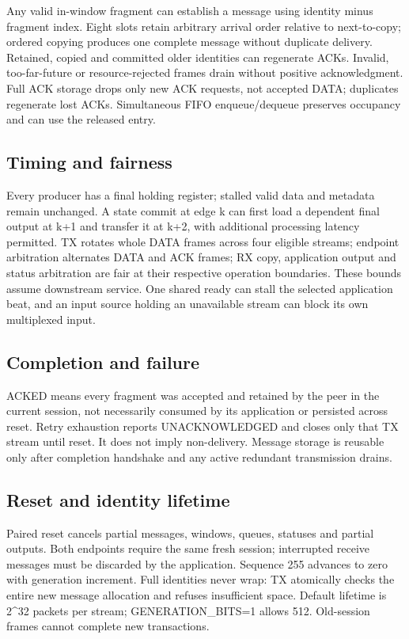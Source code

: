 \documentclass[11pt,a4paper]{article}
\begin{document}
Any valid in-window fragment can establish a message using identity minus fragment index. Eight slots retain arbitrary arrival order relative to next-to-copy; ordered copying produces one complete message without duplicate delivery. Retained,\allowbreak{} copied and committed older identities can regenerate ACKs. Invalid,\allowbreak{} too-far-future or resource-rejected frames drain without positive acknowledgment. Full ACK storage drops only new ACK requests,\allowbreak{} not accepted DATA; duplicates regenerate lost ACKs. Simultaneous FIFO enqueue/\allowbreak{}dequeue preserves occupancy and can use the released entry.

\subsection{Timing and fairness}

Every producer has a final holding register; stalled valid data and metadata remain unchanged. A state commit at edge k can first load a dependent final output at k+\allowbreak{}1 and transfer it at k+\allowbreak{}2,\allowbreak{} with additional processing latency permitted. TX rotates whole DATA frames across four eligible streams; endpoint arbitration alternates DATA and ACK frames; RX copy,\allowbreak{} application output and status arbitration are fair at their respective operation boundaries. These bounds assume downstream service. One shared ready can stall the selected application beat,\allowbreak{} and an input source holding an unavailable stream can block its own multiplexed input.

\subsection{Completion and failure}

ACKED means every fragment was accepted and retained by the peer in the current session,\allowbreak{} not necessarily consumed by its application or persisted across reset. Retry exhaustion reports UNACKNOWLEDGED and closes only that TX stream until reset. It does not imply non-delivery. Message storage is reusable only after completion handshake and any active redundant transmission drains.

\subsection{Reset and identity lifetime}

Paired reset cancels partial messages,\allowbreak{} windows,\allowbreak{} queues,\allowbreak{} statuses and partial outputs. Both endpoints require the same fresh session; interrupted receive messages must be discarded by the application. Sequence 255 advances to zero with generation increment. Full identities never wrap: TX atomically checks the entire new message allocation and refuses insufficient space. Default lifetime is 2\textasciicircum{}32 packets per stream; GENERATION\_\allowbreak{}BITS=\allowbreak{}1 allows 512. Old-session frames cannot complete new transactions.
\end{document}
